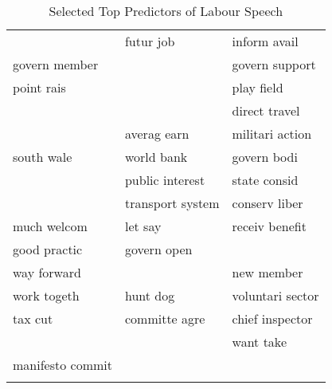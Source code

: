 \begingroup\scriptsize
\begin{longtable}{p{}p{}p{}}
\caption{Selected Top Predictors of Labour Speech} \\ 
  \hline
  \hline
  \color{red}{trade union} & futur job & inform avail \\ 
  govern member & \color{red}{welfar state} & govern support \\ 
  point rais & \color{red}{winter fuel} & play field \\ 
  \color{red}{bedroom tax} & \color{red}{coal mine} & direct travel \\ 
  \color{red}{work peopl} & averag earn & militari action \\ 
  south wale & world bank & govern bodi \\ 
  \color{red}{new deal} & public interest & state consid \\ 
  \color{red}{spend cut} & transport system & conserv liber \\ 
  much welcom & let say & receiv benefit \\ 
  good practic & govern open & \color{red}{school meal} \\ 
  way forward & \color{red}{bank levi} & new member \\ 
  work togeth & hunt dog & voluntari sector \\ 
  tax cut & committe agre & chief inspector \\ 
  \color{red}{poll tax} & \color{red}{food bank} & want take \\ 
  manifesto commit & \color{red}{invest public} & \color{red}{social justic} \\ 
  \hline
\hline
\label{tab:top_100c}
\end{longtable}
\endgroup
